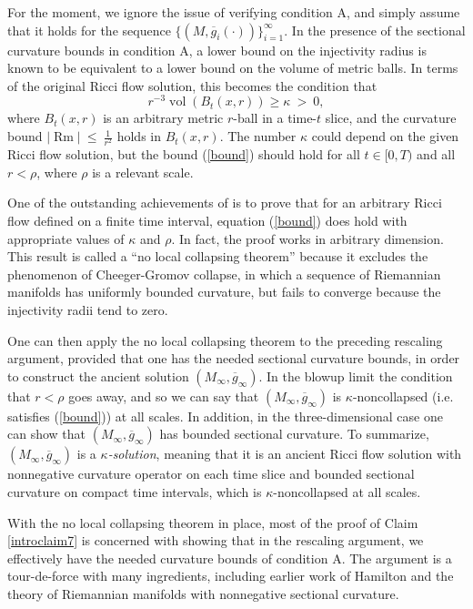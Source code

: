 \documentclass[12pt]{amsart}
\newcommand{\Rm}{\operatorname{Rm}}
\newcommand{\vol}{\operatorname{vol}}
\numberwithin{equation}{section}
\theoremstyle{plain}
\theoremstyle{definition}
\theoremstyle{remark}
\begin{document}
For the moment, we ignore the issue of verifying condition A,
and simply assume that it holds for the sequence 
$\{(M, \overline{g}_i(\cdot))\}_{i=1}^\infty$.
 In the presence
of the sectional curvature bounds in condition A,  a lower 
bound on the injectivity
radius is known to be equivalent to a lower bound on the volume of
metric balls.  In terms of the original Ricci flow solution, this 
becomes the condition that
\begin{equation} \label{bound}
r^{-3} \vol(B_t(x, r)) \ge \kappa \: > \: 0,
\end{equation} 
where  $B_t(x, r)$ is 
an arbitrary
metric $r$-ball in a time-$t$ slice, and the   curvature
bound   $|\Rm| \: \le \: \frac{1}{r^2}$ holds in $B_t(x,r)$.
The number $\kappa$ could depend on the
given Ricci flow solution, but the bound (\ref{bound})
should hold for all $t \in [0, T)$ and all $r < \rho$, where $\rho$ is a relevant
scale.  


One of the outstanding achievements of \cite{Perelman} is to prove that
for an arbitrary Ricci flow defined on a
finite time interval, equation
(\ref{bound}) does hold with appropriate values of $\kappa$ and $\rho$.
In fact, the proof works in arbitrary dimension.
This result is called
a ``no local collapsing
theorem'' because it excludes the phenomenon of Cheeger-Gromov
collapse, in which a sequence of Riemannian manifolds has uniformly
bounded curvature, but fails to converge because the injectivity 
radii tend to zero.

One can then
apply the no local collapsing theorem to the preceding rescaling argument,
provided that one has the needed sectional curvature bounds, in order to construct the 
ancient solution $(M_\infty,\overline g_\infty)$.  
In the blowup limit the condition that $r < \rho$ goes away, and so we
can say that $(M_\infty,\overline g_\infty)$ is $\kappa$-noncollapsed
(i.e. satisfies (\ref{bound})) at all scales. In addition, in the three-dimensional
case one can show that $(M_\infty,\overline g_\infty)$ has bounded sectional
curvature. To summarize, $(M_\infty,\overline g_\infty)$ is a 
{\em $\kappa$-solution},
meaning that it is an ancient Ricci flow solution with nonnegative curvature operator on
each time slice and bounded sectional curvature
on compact time intervals,
which is $\kappa$-noncollapsed
at all scales.

With  the no local collapsing theorem in place, most of the proof of  
Claim \ref{introclaim7} is concerned with showing that in the rescaling
argument, we effectively have the needed curvature
bounds of condition A.  The argument is a tour-de-force with many ingredients,
including earlier work
of Hamilton and the theory of 
Riemannian manifolds with nonnegative sectional curvature.
\end{document}

